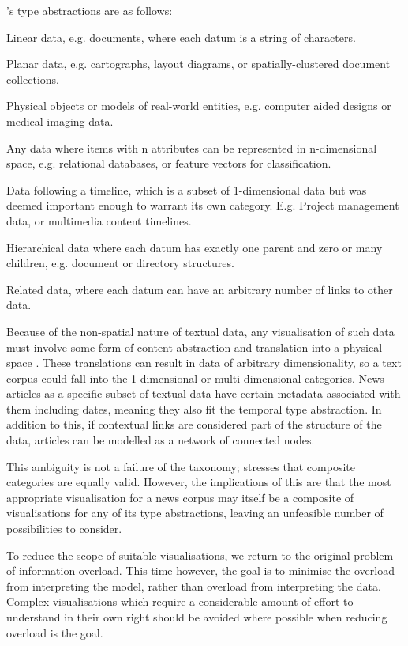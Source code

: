 \citeauthor{TheEyesHaveIt}'s type abstractions are as follows:
\begin{description}[leftmargin=11em,style=nextline]
	\item [1-dimensional] Linear data, e.g. documents, where each datum is a string of characters.
	\item[2-dimensional] Planar data, e.g. cartographs, layout diagrams, or spatially-clustered document collections.
	\item[3-dimensional] Physical objects or models of real-world entities, e.g. computer aided designs or medical imaging data.
	\item[Multi-dimensional] Any data where items with n attributes can be represented in n-dimensional space, e.g. relational databases, or feature vectors for classification.
	\item[Temporal] Data following a timeline, which is a subset of 1-dimensional data but was deemed important enough to warrant its own category. E.g. Project management data, or multimedia content timelines.
	\item[Tree] Hierarchical data where each datum has exactly one parent and zero or many children, e.g. document or directory structures.
	\item[Network] Related data, where each datum can have an arbitrary number of links to other data.
\end{description}

Because of the non-spatial nature of textual data, any visualisation of such data must involve some form of content abstraction and translation into a physical space \citep{VisualizingTheNonVisual}. These translations can result in data of arbitrary dimensionality, so a text corpus could fall into the 1-dimensional or multi-dimensional categories. News articles as a specific subset of textual data have certain metadata associated with them including dates, meaning they also fit the temporal type abstraction. In addition to this, if contextual links are considered part of the structure of the data, articles can be modelled as a network of connected nodes.

This ambiguity is not a failure of the taxonomy; \citeauthor{TheEyesHaveIt} stresses that composite categories are equally valid. However, the implications of this are that the most appropriate visualisation for a news corpus may itself be a composite of visualisations for any of its type abstractions, leaving an unfeasible number of possibilities to consider. 

To reduce the scope of suitable visualisations, we return to the original problem of information overload. This time however, the goal is to minimise the overload from interpreting the model, rather than overload from interpreting the data. Complex visualisations which require a considerable amount of effort to understand in their own right should be avoided where possible when reducing overload is the goal. 

